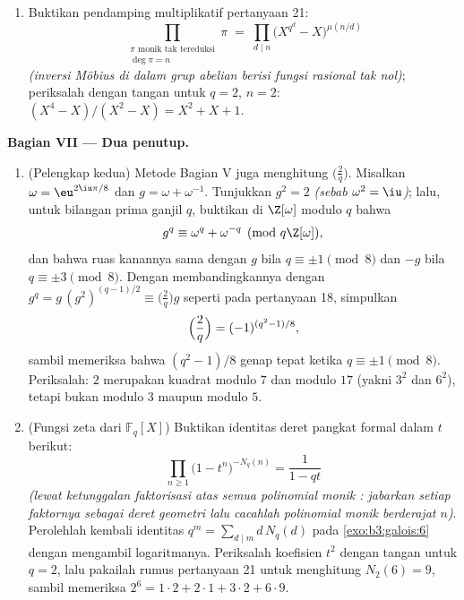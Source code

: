 \begin{problem}
\begin{enumerate}[resume]
        teorema bilangan prima, dengan $\log x$ ditukar oleh $n$;
        periksalah secara numerik untuk $q = 2$, $n \leq 4$
        (\cref{exo:b3:galois:6} mendaftarkan cacahannya).
  \item Buktikan pendamping multiplikatif pertanyaan 21:
        \[
        \prod_{\substack{\pi \text{ monik tak tereduksi}\\ \deg\pi =
        n}}\pi \;=\; \prod_{d \mid n}
        \bigl(X^{q^d} - X\bigr)^{\mu(n/d)}
        \]
        \emph{(inversi Möbius di dalam grup abelian berisi
        fungsi rasional tak nol)}; periksalah dengan tangan untuk $q
        = 2$, $n = 2$: $(X^4 - X)/(X^2 - X) = X^2 + X + 1$.
\end{enumerate}

\medskip
\noindent\textbf{Bagian VII --- Dua penutup.}
\begin{enumerate}[resume]
  \item (Pelengkap kedua) Metode Bagian V juga menghitung
        $\bigl(\frac2q\bigr)$. Misalkan $\omega = \eu^{2\iu\pi/8}$
        dan $g = \omega + \omega^{-1}$. Tunjukkan $g^2 = 2$
        \emph{(sebab $\omega^2 = \iu$)}; lalu, untuk bilangan prima ganjil $q$,
        buktikan di $\Z[\omega]$ modulo $q$ bahwa
        \[
        g^q \equiv \omega^q + \omega^{-q} \pmod{q\Z[\omega]},
        \]
        dan bahwa ruas kanannya sama dengan $g$ bila $q \equiv \pm1
        \pmod 8$ dan $-g$ bila $q \equiv \pm3 \pmod 8$. Dengan membandingkannya
        dengan $g^q = g\,(g^2)^{(q-1)/2} \equiv
        \bigl(\frac2q\bigr)g$ seperti pada pertanyaan 18, simpulkan
        \[
        \Bigl(\frac2q\Bigr) = (-1)^{(q^2-1)/8},
        \]
        sambil memeriksa bahwa $(q^2 - 1)/8$ genap tepat ketika $q
        \equiv \pm1 \pmod 8$. Periksalah: $2$ merupakan kuadrat modulo $7$
        dan modulo $17$ (yakni $3^2$ dan $6^2$), tetapi bukan modulo $3$ maupun modulo
        $5$.
  \item (Fungsi zeta dari $\mathbb F_q[X]$) Buktikan
        identitas deret pangkat formal dalam $t$ berikut:
        \[
        \prod_{n \geq 1}\bigl(1 - t^n\bigr)^{-N_q(n)}
        = \frac1{1 - qt}
        \]
        \emph{(lewat ketunggalan faktorisasi atas semua polinomial monik :
        jabarkan setiap faktornya sebagai deret geometri lalu cacahlah
        polinomial monik berderajat $n$)}. Perolehlah kembali identitas
        $q^m = \sum_{d \mid m}d\,N_q(d)$ pada
        \cref{exo:b3:galois:6} dengan mengambil logaritmanya. Periksalah
        koefisien $t^2$ dengan tangan untuk $q = 2$, lalu pakailah
        rumus pertanyaan 21 untuk menghitung $N_2(6) = 9$,
        sambil memeriksa $2^6 = 1\cdot2 + 2\cdot1 + 3\cdot2 +
        6\cdot9$.

\end{enumerate}
\end{problem}
